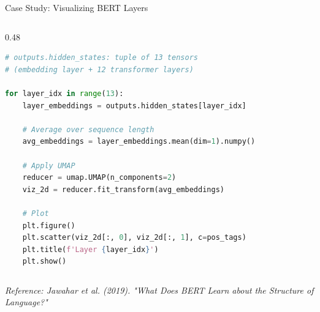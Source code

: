 \documentclass[aspectratio=169]{beamer}
\begin{document}
\begin{frame}[fragile]{Case Study: Visualizing BERT Layers 🔬}
\begin{columns}[T]
\begin{column}{0.48\textwidth}
\begin{lstlisting}[language=Python]
# outputs.hidden_states: tuple of 13 tensors
# (embedding layer + 12 transformer layers)

for layer_idx in range(13):
    layer_embeddings = outputs.hidden_states[layer_idx]

    # Average over sequence length
    avg_embeddings = layer_embeddings.mean(dim=1).numpy()

    # Apply UMAP
    reducer = umap.UMAP(n_components=2)
    viz_2d = reducer.fit_transform(avg_embeddings)

    # Plot
    plt.figure()
    plt.scatter(viz_2d[:, 0], viz_2d[:, 1], c=pos_tags)
    plt.title(f'Layer {layer_idx}')
    plt.show()
\end{lstlisting}
\end{column}
\end{columns}

\vspace{0.5em}
\small
\textit{Reference: Jawahar et al. (2019). "What Does BERT Learn about the Structure of Language?"}
\end{frame}
\end{document}

